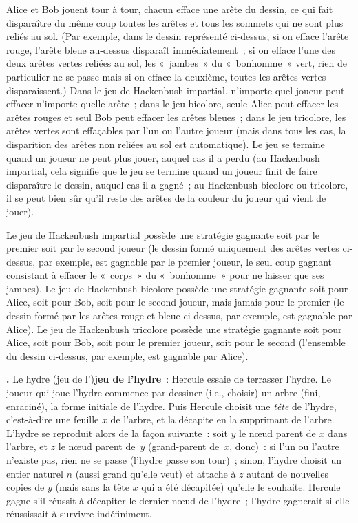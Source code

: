 \documentclass[12pt,a4paper]{article}
\theoremstyle{definition}
\newcommand\thingy{%
\refstepcounter{comcnt}\smallskip\noindent\textbf{\thecomcnt.} }
\newcommand{\defin}[2][]{\def\latexsucks{#1}\ifx\latexsucks\empty\index{#2}\else\index{\latexsucks}\fi\textbf{#2}}
\begin{document}
Alice et Bob jouent tour à tour, chacun efface une arête du dessin, ce
qui fait disparaître du même coup toutes les arêtes et tous les
sommets qui ne sont plus reliés au sol.  (Par exemple, dans le dessin
représenté ci-dessus, si on efface l'arête rouge, l'arête bleue
au-dessus disparaît immédiatement ; si on efface l'une des deux arêtes
vertes reliées au sol, les « jambes » du « bonhomme » vert, rien de
particulier ne se passe mais si on efface la deuxième, toutes les
arêtes vertes disparaissent.)  Dans le jeu de Hackenbush impartial,
n'importe quel joueur peut effacer n'importe quelle arête ; dans le
jeu bicolore, seule Alice peut effacer les arêtes rouges et seul Bob
peut effacer les arêtes bleues ; dans le jeu tricolore, les arêtes
vertes sont effaçables par l'un ou l'autre joueur (mais dans tous les
cas, la disparition des arêtes non reliées au sol est automatique).
Le jeu se termine quand un joueur ne peut plus jouer, auquel cas il a
perdu (au Hackenbush impartial, cela signifie que le jeu se termine
quand un joueur finit de faire disparaître le dessin, auquel cas il a
gagné ; au Hackenbush bicolore ou tricolore, il se peut bien sûr qu'il
reste des arêtes de la couleur du joueur qui vient de jouer).

Le jeu de Hackenbush impartial possède une stratégie gagnante soit par
le premier soit par le second joueur (le dessin formé uniquement des
arêtes vertes ci-dessus, par exemple, est gagnable par le premier
joueur, le seul coup gagnant consistant à effacer le « corps » du
« bonhomme » pour ne laisser que ses jambes).  Le jeu de Hackenbush
bicolore possède une stratégie gagnante soit pour Alice, soit pour
Bob, soit pour le second joueur, mais jamais pour le premier (le
dessin formé par les arêtes rouge et bleue ci-dessus, par exemple, est
gagnable par Alice).  Le jeu de Hackenbush tricolore possède une
stratégie gagnante soit pour Alice, soit pour Bob, soit pour le
premier joueur, soit pour le second (l'ensemble du dessin ci-dessus,
par exemple, est gagnable par Alice).

\thingy\label{introduction-hydra-game}
Le \defin[hydre (jeu de l')]{jeu de l'hydre} : Hercule essaie de terrasser
l'hydre.  Le joueur qui joue l'hydre commence par dessiner (i.e.,
choisir) un arbre (fini, enraciné), la forme initiale de l'hydre.
Puis Hercule choisit une \emph{tête} de l'hydre, c'est-à-dire une
feuille $x$ de l'arbre, et la décapite en la supprimant de l'arbre.
L'hydre se reproduit alors de la façon suivante : soit $y$ le nœud
parent de $x$ dans l'arbre, et $z$ le nœud parent de $y$ (grand-parent
de $x$, donc) : si l'un ou l'autre n'existe pas, rien ne se passe
(l'hydre passe son tour) ; sinon, l'hydre choisit un entier naturel
$n$ (aussi grand qu'elle veut) et attache à $z$ autant de nouvelles
copies de $y$ (mais sans la tête $x$ qui a été décapitée) qu'elle le
souhaite.  Hercule gagne s'il réussit à décapiter le dernier nœud de
l'hydre ; l'hydre gagnerait si elle réussissait à survivre
indéfiniment.
\end{document}
